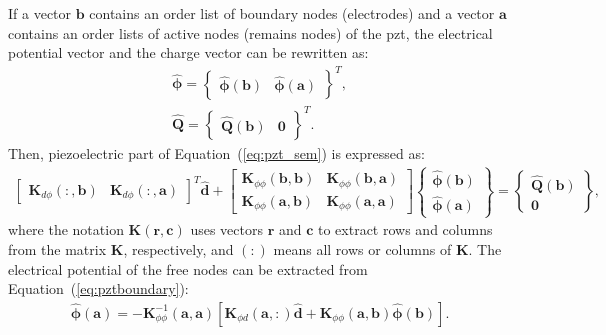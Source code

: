 \documentclass[11pt,a4paper,final]{report}
\begin{document}
If a vector \(\textbf{b}\) contains an order list of boundary nodes (electrodes) and a vector \(\textbf{a}\) contains an order lists of active nodes (remains nodes) of the \ac{pzt}, the electrical potential vector and the charge vector can be rewritten as:
\begin{eqnarray}
	\widehat{\boldsymbol{\phi}} = \left \{\begin{array}{cc}
		\widehat{\boldsymbol{\phi}}(\textbf{b}) &
		\widehat{\boldsymbol{\phi}}(\textbf{a})
	\end{array}\right \}^T,\\
	\widehat{\textbf{Q}} = \left \{\begin{array}{cc}
		\widehat{\textbf{Q}}(\textbf{b}) & \textbf{0}
	\end{array}\right \}^T.
	\label{eq:phi_Q}
\end{eqnarray}
Then, piezoelectric part of Equation~(\ref{eq:pzt_sem}) is expressed as:
\begin{eqnarray}
	\left [\begin{array}{cc}
		\textbf{K}_{d \phi}(:,\textbf{b}) &
		\textbf{K}_{d \phi}(:,\textbf{a})
	\end{array}\right]^T
	\widehat{\textbf{d}} +
	\left [\begin{array}{cc}
		\textbf{K}_{\phi \phi}(\textbf{b},\textbf{b}) & \textbf{K}_{\phi \phi}(\textbf{b},\textbf{a})\\
		\textbf{K}_{\phi \phi}(\textbf{a},\textbf{b}) & \textbf{K}_{\phi \phi}(\textbf{a},\textbf{a})
	\end{array}\right]
	\left \{\begin{array}{c}
		\widehat{\boldsymbol{\phi}}(\textbf{b}) \\
		\widehat{\boldsymbol{\phi}}(\textbf{a})
	\end{array}\right \} = 
	\left \{\begin{array}{c}
		\widehat{\textbf{Q}}(\textbf{b}) \\
		\textbf{0}
	\end{array}\right \},
	\label{eq:pztboundary}
\end{eqnarray}
where the notation \(\textbf{K}(\textbf{r},\textbf{c})\) uses vectors \(\textbf{r}\) and \(\textbf{c}\) to extract rows and columns from the matrix \(\textbf{K}\), respectively, and \((:)\) means all rows or columns of \(\textbf{K}\).
The electrical potential of the free nodes can be extracted from Equation~(\ref{eq:pztboundary}):
\begin{eqnarray}
	\widehat{\boldsymbol{\phi}}(\textbf{a}) = -\textbf{K}_{\phi\phi}^{-1}(\textbf{a},\textbf{a})\left[\textbf{K}_{\phi d}(\textbf{a},:) \widehat{\textbf{d}} + \textbf{K}_{\phi\phi}(\textbf{a},\textbf{b})\widehat{\boldsymbol{\phi}}(\textbf{b}) \right].
	\label{eq:freePotetial}
\end{eqnarray}
\end{document}
